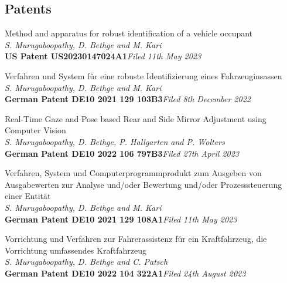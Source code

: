 \documentclass[margin,line]{resume}
\begin{document}
\begin{resume}


    \section{\mysidestyle \normalsize{Patents}}%

        \begin{list2}\setlength\itemsep{0.75mm}
        \item Method and apparatus for robust identification of a vehicle occupant\\
        \textsl{S. Murugaboopathy, D. Bethge and M. Kari}\\
        \textbf{US Patent US20230147024A1}\hfill \textit{Filed 11th May 2023}
        
        \item Verfahren und System f\"ur eine robuste Identifizierung eines Fahrzeuginsassen\\
        \textsl{S. Murugaboopathy, D. Bethge and M. Kari}\\
        \textbf{German Patent DE10 2021 129 103B3}\hfill \textit{Filed 8th December 2022}
        
        \item Real-Time Gaze and Pose based Rear and Side Mirror Adjustment using Computer Vision\\
        \textsl{S. Murugaboopathy, D. Bethge, P. Hallgarten and P. Wolters}\\
        \textbf{German Patent DE10 2022 106 797B3}\hfill \textit{Filed 27th April 2023}

        \item Verfahren, System und Computerprogrammprodukt zum Ausgeben von Ausgabewerten zur Analyse und/oder Bewertung und/oder Prozesssteuerung einer Entit\"at\\
        \textsl{S. Murugaboopathy, D. Bethge and M. Kari}\\
        \textbf{German Patent DE10 2021 129 108A1}\hfill \textit{Filed 11th May 2023}

        \item Vorrichtung und Verfahren zur Fahrerassistenz f\"ur ein Kraftfahrzeug, die Vorrichtung umfassendes Kraftfahrzeug\\
        \textsl{S. Murugaboopathy, D. Bethge and C. Patsch}\\
        \textbf{German Patent DE10 2022 104 322A1}\hfill \textit{Filed 24th August 2023}
        

\end{list2}
\end{resume}
\end{document}
